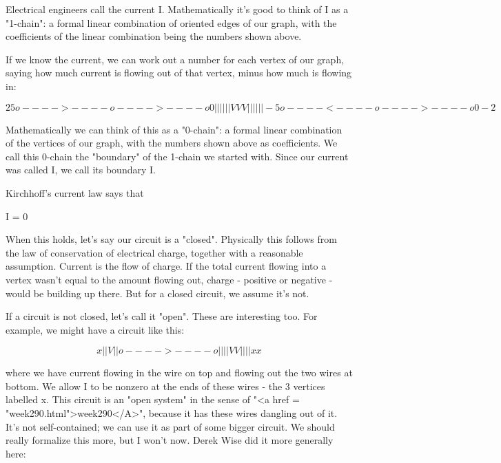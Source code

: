 Electrical engineers call the current I.  Mathematically it's good
to think of I as a "1-chain": a formal linear combination of 
oriented edges of our graph, with the coefficients of the linear combination 
being the numbers shown above.  

If we know the current, we can work out a number for each vertex of
our graph, saying how much current is flowing out of that vertex,
minus how much is flowing in:


$$

                         2     
             5 o---->----o---->----o 0 
               |         |         | 
               |         |         | 
               V         V         V 
               |         |         | 
               |         |         | 
            -5 o----<----o---->----o 0
                       -2   
$$
    

Mathematically we can think of this as a "0-chain": a formal
linear combination of the vertices of our graph, with the numbers
shown above as coefficients.  We call this 0-chain the
"boundary" of the 1-chain we started with.  Since our
current was called I, we call its boundary \delta I.

Kirchhoff's current law says that 

\delta I = 0

When this holds, let's say our circuit is a "closed".
Physically this follows from the law of conservation of electrical
charge, together with a reasonable assumption.  Current is the flow of
charge.  If the total current flowing into a vertex wasn't equal to
the amount flowing out, charge - positive or negative - would be
building up there.  But for a closed circuit, we assume it's not.

If a circuit is not closed, let's call it "open".  These are
interesting too.  For example, we might have a circuit like this:


$$

               x
               |    
               |    
               V    
               |    
               |    
               o---->----o
               |         |
               |         |
               V         V
               |         |
               |         |
               x         x         

$$
    
where we have current flowing in the wire on top and flowing out the
two wires at bottom.  We allow \delta I to be nonzero at the ends
of these wires - the 3 vertices labelled x.  This circuit is an
"open system" in the sense of "<a href =
"week290.html">week290</A>", because it has these wires dangling
out of it.  It's not self-contained; we can use it as part of some
bigger circuit.  We should really formalize this more, but I won't now.
Derek Wise did it more generally here:

